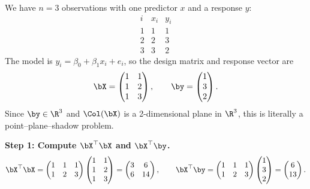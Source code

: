 

\begin{example}\label{ex:first-regression}
We have $n=3$ observations with one predictor $x$ and a response $y$:
\[
\begin{array}{c|cc}
i & x_i & y_i \\\hline
1 & 1 & 1 \\
2 & 2 & 3 \\
3 & 3 & 2
\end{array}
\]
The model is $y_i = \beta_0 + \beta_1 x_i + e_i$, so the design matrix and response vector are
\[
\bX = \begin{pmatrix} 1 & 1 \\ 1 & 2 \\ 1 & 3 \end{pmatrix}, \qquad
\by = \begin{pmatrix} 1 \\ 3 \\ 2 \end{pmatrix}.
\]
Since $\by\in\R^3$ and $\Col(\bX)$ is a 2-dimensional plane in $\R^3$,
this is literally a point--plane--shadow problem.

\medskip\noindent\textbf{Step 1: Compute $\bX^\top\bX$ and $\bX^\top\by$.}
\[
\bX^\top\bX
= \begin{pmatrix} 1 & 1 & 1 \\ 1 & 2 & 3 \end{pmatrix}
  \begin{pmatrix} 1 & 1 \\ 1 & 2 \\ 1 & 3 \end{pmatrix}
= \begin{pmatrix} 3 & 6 \\ 6 & 14 \end{pmatrix},
\qquad
\bX^\top\by
= \begin{pmatrix} 1 & 1 & 1 \\ 1 & 2 & 3 \end{pmatrix}
  \begin{pmatrix} 1 \\ 3 \\ 2 \end{pmatrix}
= \begin{pmatrix} 6 \\ 13 \end{pmatrix}.
\]


\end{example}
